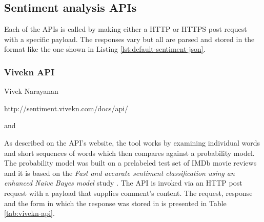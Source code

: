 \newcommand*{\APIsOverviewPath}{04-framework/02-implementation/02-apis}

\subsection{Sentiment analysis APIs\label{sec:apis}}
Each of the APIs is called by making either a HTTP or HTTPS post request with a specific payload. The responses vary but all are parsed and stored in the format like the one shown in Listing \ref{lst:default-sentiment-json}.

\subsubsection*{Vivekn API}

\begin{description}
\singlespacing
 \item[Author:] Vivek Narayanan
 \item[Web url:] http://sentiment.vivekn.com/docs/api/
 \item[Database columns:]  and 
\end{description}
As described on the API's website, the tool works by examining individual words and short sequences of words which then compares against a probability model. The probability model was built on a prelabeled test set of IMDb movie reviews
and it is based on the \emph{Fast and accurate sentiment classification using an enhanced Naive Bayes model} study \cite{DBLP:journals/corr/abs-1305-6143}.
The API is invoked via an HTTP post request with a  payload that supplies comment's content. 
The request, response and the form in which the response was stored in  is presented in Table \ref{tab:vivekn-api}.




